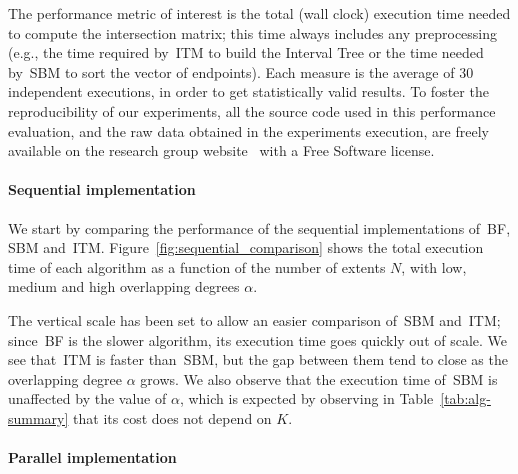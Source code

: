 \documentclass[10pt, conference, compsocconf]{IEEEtran}
\begin{document}
The performance metric of interest is the total (wall clock) execution
time needed to compute the intersection matrix; this time always
includes any preprocessing (e.g., the time required by~\ac{ITM} to
build the Interval Tree or the time needed by~\ac{SBM} to sort the
vector of endpoints). Each measure is the average of 30 independent
executions, in order to get statistically valid results. To foster the
reproducibility of our experiments, all the source code used in this
performance evaluation, and the raw data obtained in the experiments
execution, are freely available on the research group
website~\cite{pads} with a Free Software license.

\paragraph*{Sequential implementation}

\begin{figure*}[t]
\centering {}
\caption{Execution time in seconds as a function of the number $N$ of
  extents (lower is better). The vertical linear scale, as opposed to
  logarithmic scale, has been defined to allow easier comparison
  between~\ac{SBM} and~\ac{ITM}}\label{fig:sequential_comparison}
\end{figure*}

We start by comparing the performance of the sequential
implementations of~\ac{BF}, \ac{SBM} and~\ac{ITM}.
Figure~\ref{fig:sequential_comparison} shows the total execution time
of each algorithm as a function of the number of extents $N$, with
low, medium and high overlapping degrees $\alpha$.

The vertical scale has been set to allow an easier comparison
of~\ac{SBM} and~\ac{ITM}; since~\acl{BF} is the slower algorithm, its
execution time goes quickly out of scale. We see that~\ac{ITM} is
faster than~\ac{SBM}, but the gap between them tend to close as the
overlapping degree $\alpha$ grows. We also observe that the execution
time of~\ac{SBM} is unaffected by the value of $\alpha$, which is
expected by observing in Table~\ref{tab:alg-summary} that its cost
does not depend on $K$.

\paragraph*{Parallel implementation}
\end{document}

